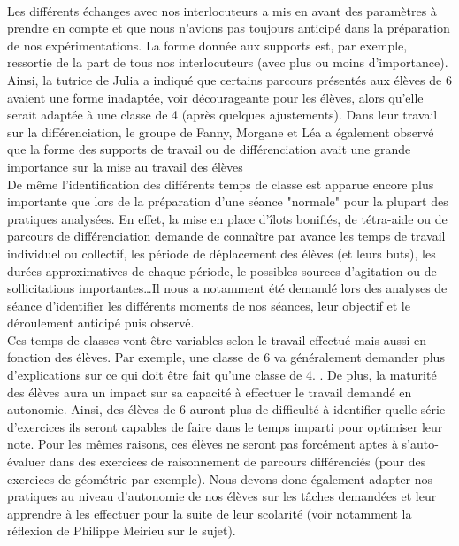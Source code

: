 \paragraph*{}
Les différents échanges avec nos interlocuteurs a mis en avant des paramètres à prendre en compte et que nous n'avions pas toujours anticipé dans la préparation de nos expérimentations. La forme donnée aux supports est, par exemple, ressortie de la part de tous nos interlocuteurs (avec plus ou moins d'importance). Ainsi, la tutrice de Julia a indiqué que certains parcours présentés aux élèves de 6 avaient une forme inadaptée, voir décourageante pour les élèves, alors qu'elle serait adaptée à une classe de 4 (après quelques ajustements). Dans leur travail sur la différenciation, le groupe de Fanny, Morgane et Léa a également observé que la forme des supports de travail ou de différenciation avait une grande importance sur la mise au travail des élèves \\
De même l'identification des différents temps de classe est apparue encore plus importante que lors de la préparation d'une séance "normale" pour la plupart des pratiques analysées. En effet, la mise en place d'îlots bonifiés, de tétra-aide ou de parcours de différenciation demande de connaître par avance les temps de travail individuel ou collectif, les période de déplacement des élèves (et leurs buts), les durées approximatives de chaque période, le possibles sources d'agitation ou de sollicitations importantes\ldots Il nous a notamment été demandé lors des analyses de séance d'identifier les différents moments de nos séances, leur objectif et le déroulement anticipé puis observé.\\
Ces temps de classes vont être variables selon le travail effectué mais aussi en fonction des élèves. Par exemple, une classe de 6 va généralement demander plus d'explications sur ce qui doit être fait qu'une classe de 4. . De plus, la maturité des élèves aura un impact sur sa capacité à effectuer le travail demandé en autonomie. Ainsi, des élèves de 6 auront plus de difficulté à identifier quelle série d'exercices ils seront capables de faire dans le temps imparti pour optimiser leur note. Pour les mêmes raisons, ces élèves ne seront pas forcément aptes à s'auto-évaluer dans des exercices de raisonnement de parcours différenciés (pour des exercices de géométrie par exemple). Nous devons donc également adapter nos pratiques au niveau d'autonomie de nos élèves sur les tâches demandées et leur apprendre à les effectuer pour la suite de leur scolarité (voir notamment la réflexion de Philippe Meirieu\cite{Meirieu_autonomie} sur le sujet).\\
